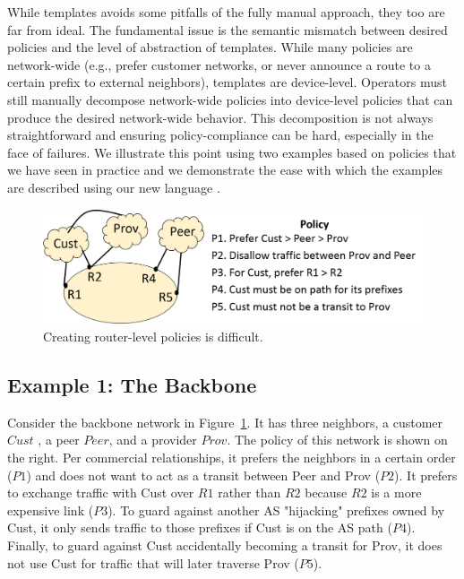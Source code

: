 While templates avoids some pitfalls of the fully manual approach, they too are far from ideal. The fundamental issue is the semantic mismatch between desired policies and the level of abstraction of templates. While many policies are network-wide (e.g., prefer customer networks, or never announce a route to a certain prefix to external neighbors), templates are device-level. Operators must still manually decompose network-wide policies into device-level policies that can produce the desired network-wide behavior.
This decomposition is not always straightforward and ensuring policy-compliance can be hard, especially in the face of failures. We illustrate this point using two examples based on policies that we have seen in practice and we demonstrate the ease with which the
examples are described using our new language \sysname.

\begin{figure}[t!]
\centering
\includegraphics[width=\columnwidth]{figures/example1}
\caption{Creating router-level policies is difficult.}
\label{fig:example1}
\end{figure}


\subsection{Example 1:  The Backbone}

Consider the backbone network in Figure~\ref{fig:example1}. It has three neighbors, a customer $Cust$ , a peer $Peer$, and a provider $Prov$. The policy of this network is shown on the right. Per commercial relationships, it prefers the neighbors in a certain order ($P1$) and does not want to act as a transit between Peer and Prov ($P2$). It prefers to exchange traffic with Cust over $R1$ rather than $R2$ because $R2$ is a more expensive link ($P3$). To guard against another AS "hijacking" prefixes owned by Cust, it only sends traffic to those prefixes if Cust is on the AS path ($P4$). Finally, to guard against Cust accidentally becoming a transit for Prov, it does not use Cust for traffic that will later traverse Prov ($P5$).

